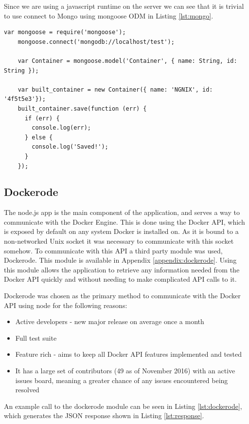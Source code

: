 Since we are using a javascript runtime on the server we can see that it is trivial to use connect to Mongo using mongoose ODM in Listing \ref{lst:mongo}.

\begin{lstlisting}[caption={Communicating with Mongo},label={lst:mongo}]
	var mongoose = require('mongoose');
	mongoose.connect('mongodb://localhost/test');

	var Container = mongoose.model('Container', { name: String, id: String });

	var built_container = new Container({ name: 'NGNIX', id: '4f5t5e3'});
	built_container.save(function (err) {
	  if (err) {
	    console.log(err);
	  } else {
	    console.log('Saved!');
	  }
	});
\end{lstlisting}

\subsection{Dockerode}
\label{sub:dockerode}

The node.js app is the main component of the application, and serves a way to communicate with the Docker Engine. This is done using the Docker API, which is exposed by default on any system Docker is installed on. As it is bound to a non-networked Unix socket it was necessary to communicate with this socket somehow. To communicate with this API a third party module was used, Dockerode. This module is available in Appendix \ref{appendix:dockerode}. Using this module allows the application to retrieve any information needed from the Docker API quickly and without needing to make complicated API calls to it. 

Dockerode was chosen as the primary method to communicate with the Docker API using node for the following reasons:

\begin{itemize}
	\item Active developers - new major release on average once a month
	\item Full test suite
	\item Feature rich - aims to keep all Docker API features implemented and tested
	\item It has a large set of contributors (49 as of November 2016) with an active issues board, meaning a greater chance of any issues encountered being resolved
\end{itemize}

An example call to the dockerode module can be seen in Listing \ref{lst:dockerode}, which generates the JSON response shown in Listing \ref{lst:response}.

